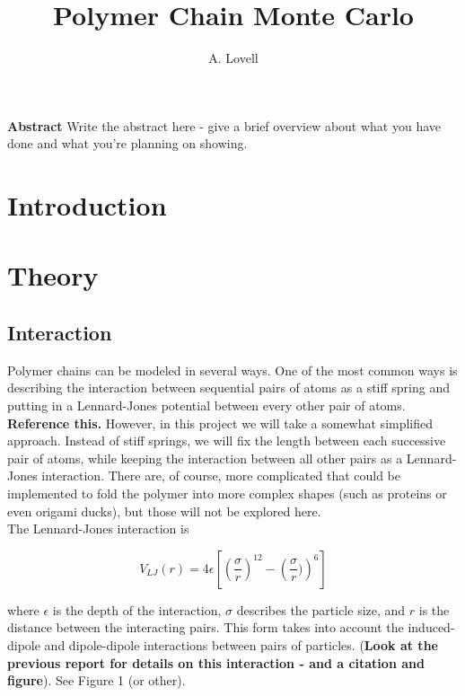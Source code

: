 \documentclass{article}
\begin{document}
\title{Polymer Chain Monte Carlo}
\author{A. Lovell}
\maketitle

\noindent \textbf{Abstract}  Write the abstract here - give a brief overview about what you have done and what you're planning on showing.

\begin{multicols}{2}

\section{Introduction}

\section{Theory}

\subsection{Interaction}

Polymer chains can be modeled in several ways.  One of the most common ways is describing the interaction between sequential pairs of atoms as a stiff spring and putting in a Lennard-Jones potential between every other pair of atoms.  \textbf{Reference this.}  However, in this project we will take a somewhat simplified approach.  Instead of stiff springs, we will fix the length between each successive pair of atoms, while keeping the interaction between all other pairs as a Lennard-Jones interaction.  There are, of course, more complicated that could be implemented to fold the polymer into more complex shapes (such as proteins or even origami ducks), but those will not be explored here.\\

The Lennard-Jones interaction is 

\begin{equation}
V_{LJ}(r) = 4\epsilon \left [ \left ( \frac{\sigma}{r} \right ) ^{12} - \left ( \frac{\sigma}{r}) \right ) ^6 \right ]
\end{equation}

\noindent where $\epsilon$ is the depth of the interaction, $\sigma$ describes the particle size, and $r$ is the distance between the interacting pairs.  This form takes into account the induced-dipole and dipole-dipole interactions between pairs of particles.  (\textbf{Look at the previous report for details on this interaction - and a citation and figure}).  See Figure 1 (or other).


\end{multicols}
\end{document}
